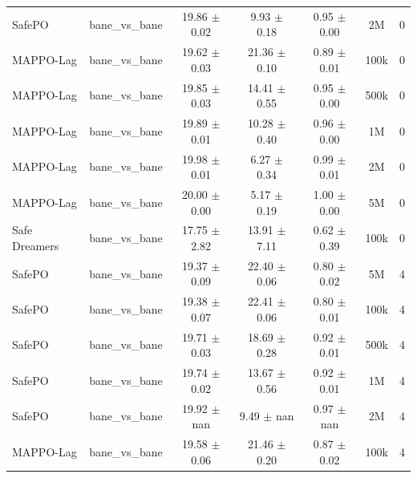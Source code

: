 \begin{longtable}{lcccccc}
SafePO & bane\_vs\_bane & \textcolor{red!70!black}{19.86 $\pm$ 0.02} & \textcolor{red!70!black}{9.93 $\pm$ 0.18} & \textcolor{red!70!black}{0.95 $\pm$ 0.00} & 2M & 0 \\
MAPPO-Lag & bane\_vs\_bane & \textcolor{red!70!black}{19.62 $\pm$ 0.03} & \textcolor{green!60!black}{21.36 $\pm$ 0.10} & \textcolor{red!70!black}{0.89 $\pm$ 0.01} & 100k & 0 \\
MAPPO-Lag & bane\_vs\_bane & \textcolor{red!70!black}{19.85 $\pm$ 0.03} & \textcolor{green!60!black}{14.41 $\pm$ 0.55} & \textcolor{red!70!black}{0.95 $\pm$ 0.00} & 500k & 0 \\
MAPPO-Lag & bane\_vs\_bane & \textcolor{red!70!black}{19.89 $\pm$ 0.01} & \textcolor{red!70!black}{10.28 $\pm$ 0.40} & \textcolor{red!70!black}{0.96 $\pm$ 0.00} & 1M & 0 \\
MAPPO-Lag & bane\_vs\_bane & \textcolor{red!70!black}{19.98 $\pm$ 0.01} & \textcolor{red!70!black}{6.27 $\pm$ 0.34} & \textcolor{red!70!black}{0.99 $\pm$ 0.01} & 2M & 0 \\
MAPPO-Lag & bane\_vs\_bane & \textcolor{red!70!black}{20.00 $\pm$ 0.00} & \textcolor{red!70!black}{5.17 $\pm$ 0.19} & \textcolor{red!70!black}{1.00 $\pm$ 0.00} & 5M & 0 \\
Safe Dreamers & bane\_vs\_bane & 17.75 $\pm$ 2.82 & 13.91 $\pm$ 7.11 & 0.62 $\pm$ 0.39 & 100k & 0 \\
\midrule
SafePO & bane\_vs\_bane & \textcolor{green!60!black}{19.37 $\pm$ 0.09} & \textcolor{green!60!black}{22.40 $\pm$ 0.06} & \textcolor{green!60!black}{0.80 $\pm$ 0.02} & 5M & 4 \\
SafePO & bane\_vs\_bane & \textcolor{green!60!black}{19.38 $\pm$ 0.07} & \textcolor{green!60!black}{22.41 $\pm$ 0.06} & \textcolor{green!60!black}{0.80 $\pm$ 0.01} & 100k & 4 \\
SafePO & bane\_vs\_bane & \textcolor{green!60!black}{19.71 $\pm$ 0.03} & \textcolor{green!60!black}{18.69 $\pm$ 0.28} & \textcolor{green!60!black}{0.92 $\pm$ 0.01} & 500k & 4 \\
SafePO & bane\_vs\_bane & \textcolor{green!60!black}{19.74 $\pm$ 0.02} & \textcolor{green!60!black}{13.67 $\pm$ 0.56} & \textcolor{green!60!black}{0.92 $\pm$ 0.01} & 1M & 4 \\
SafePO & bane\_vs\_bane & \textcolor{red!70!black}{19.92 $\pm$ nan} & \textcolor{green!60!black}{9.49 $\pm$ nan} & \textcolor{green!60!black}{0.97 $\pm$ nan} & 2M & 4 \\
MAPPO-Lag & bane\_vs\_bane & \textcolor{green!60!black}{19.58 $\pm$ 0.06} & \textcolor{green!60!black}{21.46 $\pm$ 0.20} & \textcolor{green!60!black}{0.87 $\pm$ 0.02} & 100k & 4 \\

\end{longtable}
